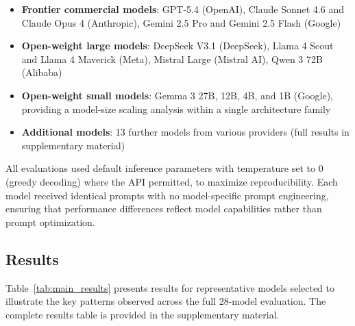 \documentclass{article}
\begin{document}
\begin{itemize}
    \item \textbf{Frontier commercial models}: GPT-5.4 (OpenAI), Claude Sonnet 4.6 and Claude Opus 4 (Anthropic), Gemini 2.5 Pro and Gemini 2.5 Flash (Google)
    \item \textbf{Open-weight large models}: DeepSeek V3.1 (DeepSeek), Llama 4 Scout and Llama 4 Maverick (Meta), Mistral Large (Mistral AI), Qwen 3 72B (Alibaba)
    \item \textbf{Open-weight small models}: Gemma 3 27B, 12B, 4B, and 1B (Google), providing a model-size scaling analysis within a single architecture family
    \item \textbf{Additional models}: 13 further models from various providers (full results in supplementary material)
\end{itemize}

All evaluations used default inference parameters with temperature set to 0 (greedy decoding) where the API permitted, to maximize reproducibility. Each model received identical prompts with no model-specific prompt engineering, ensuring that performance differences reflect model capabilities rather than prompt optimization.

\subsection{Results}

Table~\ref{tab:main_results} presents results for representative models selected to illustrate the key patterns observed across the full 28-model evaluation. The complete results table is provided in the supplementary material.
\end{document}

